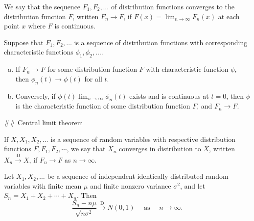 \begin{definition}
We say that the sequence $F_1 , F_2, \dots $ of distribution functions converges to the distribution function $F$, written $F_n \to F$, if $F(x) = \lim_{n\to\infty} F_n(x)$ at each point $x$ where $F$ is continuous.
\end{definition}

\begin{theorem}
Suppose that $F_1 , F_2, \dots $ is a sequence of distribution functions 
with corresponding characteristic functions $\phi_1 , \phi_2, \dots $.
\begin{enumerate}[(a)]
    \item If $F_n \to F$ for some distribution function $F$ with characteristic function $\phi$, then $\phi_n(t) \to \phi(t)$ for all $t$.
    \item Conversely, if $\phi(t) \lim_{n\to\infty} \phi_n(t)$ exists and is continuous at $t=0$, then $\phi$ is the characteristic function of some distribution function $F$, and $F_n \to F$.
\end{enumerate}
\end{theorem}


## Central limit theorem
\begin{definition}
If $X, X_1 , X_2 , \dots$ is a sequence of random variables with respective distribution functions $F, F_1, F_2, \cdots$, we say that $X_n$ converges in distribution to $X$, written $X_{n} \stackrel{\mathrm{D}}{\rightarrow} X$, if $F_n \to F$ as $n \to\infty$.
\end{definition}

\begin{theorem}
Let $X_1 , X_2, \dots$ be a sequence of independent identically distributed random variables with finite mean $\mu$ and finite nonzero variance $\sigma^2$, and let $S_n = X_1 + X_2 + \cdots + X_n$. Then
\begin{equation*}
    \frac{S_{n}-n \mu}{\sqrt{n \sigma^{2}}} \stackrel{\mathrm{D}}{\rightarrow} N(0,1) \quad \text { as } \quad n \rightarrow \infty.
\end{equation*}
\end{theorem}

